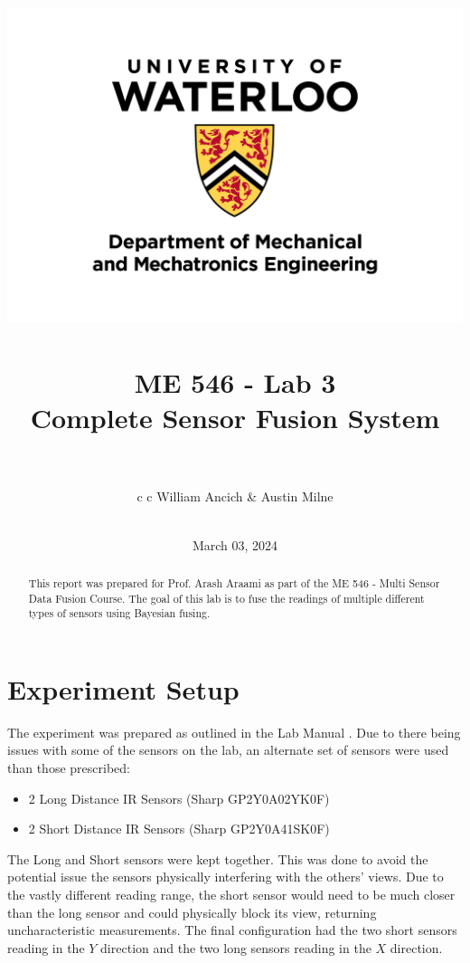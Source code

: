 \documentclass[12pt]{article}
\title{
    \includegraphics[width=0.75\linewidth]{resources/uwaterloo_mechanical_and_mechatronics_engineering/UWaterloo_Mechanical_Mechatronics_Eng_Logo_vert_rgb.png}
    \\~\\
    \bf{
        ME 546 - Lab 3 \\
        Complete Sensor Fusion System
    }
    \sepline
    \\~\\
}
\author{
    \begin{center}
        \begin{tabular}{ c c }
        William Ancich & Austin Milne \\
        \multicolumn{2}{ c }{Jude Bennett} \\
        \end{tabular}
    \end{center}
}
\date{March 03, 2024}
\begin{document}
\maketitle
\vfill %
\begin{abstract}
    \centering\noindent
    This report was prepared for Prof. Arash Araami as part of the ME 546 - Multi Sensor Data Fusion Course. The goal of this lab is to fuse the readings of multiple different types of sensors using Bayesian fusing.
\end{abstract}

\clearpage
{} %

\tableofcontents
\clearpage

\listoftables %
\listoffigures %
\lstlistoflistings %

\clearpage
{} %
\section{Experiment Setup} \label{sec:setup}

The experiment was prepared as outlined in the Lab Manual \cite{lab-manual}. Due to there being issues with some of the sensors on the lab, an alternate set of sensors were used than those prescribed:

\begin{itemize}
    \item 2 Long Distance IR Sensors (Sharp GP2Y0A02YK0F)
    \item 2 Short Distance IR Sensors (Sharp GP2Y0A41SK0F)
\end{itemize}

\noindent The Long and Short sensors were kept together. This was done to avoid the potential issue the sensors physically interfering with the others' views. Due to the vastly different reading range, the short sensor would need to be much closer than the long sensor and could physically block its view, returning uncharacteristic measurements. The final configuration had the two short sensors reading in the $Y$ direction and the two long sensors reading in the $X$ direction.
\end{document}
